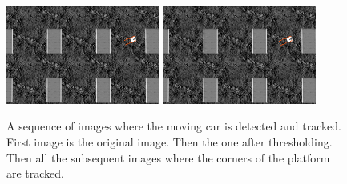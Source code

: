 \begin{figure}[!htbp]
  \vspace{1cm}
  {\includegraphics[width=0.45\textwidth]{img/18856_optical_flow.png}\label{fig:optical5}}
  \hfill
  {\includegraphics[width=0.45\textwidth]{img/18881_optical_flow.png}\label{fig:optical6}}
 
  \caption{A sequence of images where the moving car is detected and tracked. First image is the original image. Then the one after thresholding. Then all the subsequent images where the corners of the platform are tracked.}
  \label{fig:optical_folw_sequence}
\end{figure} 

